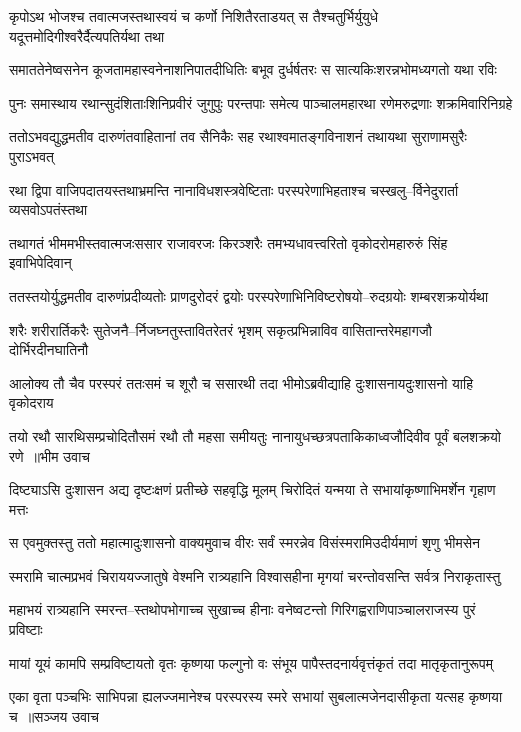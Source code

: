 \twolineshloka
{कृपोऽथ भोजश्च तवात्मजस्तथास्वयं च कर्णो निशितैरताडयत्}
{स तैश्चतुर्भिर्युयुधे यदूत्तमोदिगीश्वरैर्दैत्यपतिर्यथा तथा}


\twolineshloka
{समाततेनेष्वसनेन कूजतामहास्वनेनाशनिपातदीधितिः}
{बभूव दुर्धर्षतरः स सात्यकिःशरन्नभोमध्यगतो यथा रविः}


\twolineshloka
{पुनः समास्थाय रथान्सुदंशिताःशिनिप्रवीरं जुगुपुः परन्तपाः}
{समेत्य पाञ्चालमहारथा रणेमरुद्रणाः शक्रमिवारिनिग्रहे}


\twolineshloka
{ततोऽभवद्युद्धमतीव दारुणंतवाहितानां तव सैनिकैः सह}
{रथाश्वमातङ्गविनाशनं तथायथा सुराणामसुरैः पुराऽभवत्}


\twolineshloka
{रथा द्विपा वाजिपदातयस्तथाभ्रमन्ति नानाविधशस्त्रवेष्टिताः}
{परस्परेणाभिहताश्च चस्खलु--र्विनेदुरार्ता व्यसवोऽपतंस्तथा}


\twolineshloka
{तथागतं भीममभीस्तवात्मजःससार राजावरजः किरञ्शरैः}
{तमभ्यधावत्त्वरितो वृकोदरोमहारुरुं सिंह इवाभिपेदिवान्}


\twolineshloka
{ततस्तयोर्युद्धमतीव दारुणंप्रदीव्यतोः प्राणदुरोदरं द्वयोः}
{परस्परेणाभिनिविष्टरोषयो--रुदग्रयोः शम्बरशक्रयोर्यथा}


\twolineshloka
{शरैः शरीरार्तिकरैः सुतेजनै--र्निजघ्नतुस्तावितरेतरं भृशम्}
{सकृत्प्रभिन्नाविव वासितान्तरेमहागजौ दोर्भिरदीनघातिनौ}


\twolineshloka
{आलोक्य तौ चैव परस्परं ततःसमं च शूरौ च ससारथी तदा}
{भीमोऽब्रवीद्याहि दुःशासनायदुःशासनो याहि वृकोदराय}


\threelineshloka
{तयो रथौ सारथिसम्प्रचोदितौसमं रथौ तौ महसा समीयतुः}
{नानायुधच्छत्रपताकिकाध्वजौदिवीव पूर्वं बलशक्रयो रणे ॥भीम उवाच}
{}


\twolineshloka
{दिष्ट्याऽसि दुःशासन अद्य दृष्टःक्षणं प्रतीच्छे सहवृद्धि मूलम्}
{चिरोदितं यन्मया ते सभायांकृष्णाभिमर्शेन गृहाण मत्तः}


\twolineshloka
{स एवमुक्तस्तु ततो महात्मादुःशासनो वाक्यमुवाच वीरः}
{सर्वं स्मरन्नेव विसंस्मरामिउदीर्यमाणं शृणु भीमसेन}


\twolineshloka
{स्मरामि चात्मप्रभवं चिराययज्जातुषे वेश्मनि रात्र्यहानि}
{विश्वासहीना मृगयां चरन्तोवसन्ति सर्वत्र निराकृतास्तु}


\twolineshloka
{महाभयं रात्र्यहानि स्मरन्त--स्तथोपभोगाच्च सुखाच्च हीनाः}
{वनेष्वटन्तो गिरिगह्वराणिपाञ्चालराजस्य पुरं प्रविष्टाः}


\twolineshloka
{मायां यूयं कामपि सम्प्रविष्टायतो वृतः कृष्णया फल्गुनो वः}
{संभूय पापैस्तदनार्यवृत्तंकृतं तदा मातृकृतानुरूपम्}


\fourlineindentedshloka
{एका वृता पञ्चभिः साभिपन्ना}
{ह्यलज्जमानेश्च परस्परस्य}
{स्मरे सभायां सुबलात्मजेनदासीकृता यत्सह कृष्णया च ॥सञ्जय उवाच}
{}


